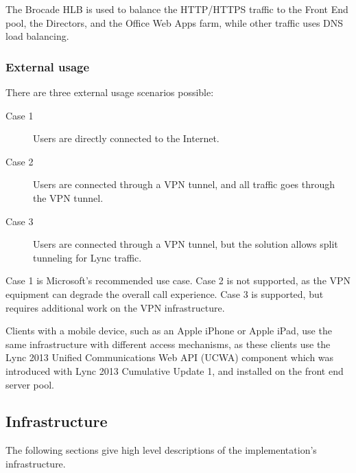 The Brocade HLB is used to balance the HTTP/HTTPS traffic to the Front End pool, the Directors, and the Office Web Apps farm, while other traffic uses DNS load balancing.



\subsubsection{External usage}

There are three external usage scenarios possible:
\begin{description}
	\item[Case 1] Users are directly connected to the Internet.
	\item[Case 2] Users are connected through a VPN tunnel, and all traffic goes through the VPN tunnel.
	\item[Case 3] Users are connected through a VPN tunnel, but the solution allows split tunneling for Lync traffic.
\end{description}
Case 1 is Microsoft's recommended use case. Case 2 is not supported, as the VPN equipment can degrade the overall call experience. Case 3 is supported, but requires additional work on the VPN infrastructure.

Clients with a mobile device, such as an Apple iPhone or Apple iPad, use the same infrastructure with different access mechanisms, as these clients use the Lync 2013 Unified Communications Web API (UCWA) component which was introduced with Lync 2013 Cumulative Update 1, and installed on the front end server pool.






\subsection{Infrastructure}
	The following sections give high level descriptions of the implementation's infrastructure.

